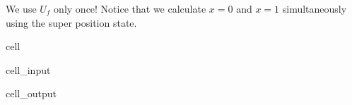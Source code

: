 \documentclass[letterpaper,10pt,english]{jupyterBook}
\begin{document}
\sphinxAtStartPar
We use \(U_f\) only once!   Notice that we calculate \(x=0\) and \(x=1\) simultaneously using the super position state.

\begin{sphinxuseclass}{cell}\begin{sphinxVerbatimInput}

\begin{sphinxuseclass}{cell_input}
\begin{sphinxVerbatim}[commandchars=\\\{\}]

\PYG{p}{[}\PYG{p}{]}
\PYG{p}{[}\PYG{p}{[}\PYG{p}{]}\PYG{p}{[}\PYG{p}{]}\PYG{p}{]}
\PYG{p}{[}\PYG{p}{]}
\PYG{p}{[}\PYG{p}{]}\PYG{p}{[}\PYG{p}{]}

\end{sphinxVerbatim}

\end{sphinxuseclass}\end{sphinxVerbatimInput}
\begin{sphinxVerbatimOutput}

\begin{sphinxuseclass}{cell_output}
\noindent{}

\end{sphinxuseclass}\end{sphinxVerbatimOutput}

\end{sphinxuseclass}
\end{document}
